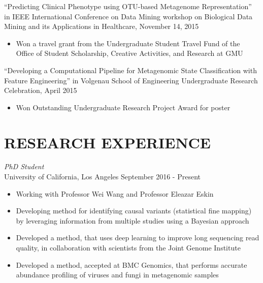 \documentclass[margin, 10pt]{res} %
\begin{document}
\begin{resume}
``Predicting Clinical Phenotype using OTU-based Metagenome Representation'' in IEEE International Conference on Data Mining workshop on Biological Data Mining and its Applications in Healthcare, November 14, 2015
\begin{itemize} \itemsep -2pt %
\item Won a travel grant from the Undergraduate Student Travel Fund of the Office of Student Scholarship, Creative Activities, and Research at GMU
\end{itemize}

``Developing a Computational Pipeline for Metagenomic State Classification with Feature Engineering'' in Volgenau School of Engineering Undergraduate Research Celebration, April 2015
\begin{itemize} \itemsep -2pt %
\item Won Outstanding Undergraduate Research Project Award for poster
\end{itemize}


\section{RESEARCH EXPERIENCE}

{\sl PhD Student} \\
University of California, Los Angeles \hfill September 2016 - Present
\begin{itemize} \itemsep -2pt %
\item Working with Professor Wei Wang and Professor Eleazar Eskin
\item Developing method for identifying causal variants (statistical fine mapping) by leveraging information from multiple studies using a Bayesian approach 
\item Developed a method, that uses deep learning to improve long sequencing read quality, in collaboration with scientists from the Joint Genome Institute
\item Developed a method, accepted at BMC Genomics, that performs accurate abundance profiling of viruses and fungi in metagenomic samples
\end{itemize}


\end{resume}
\end{document}
